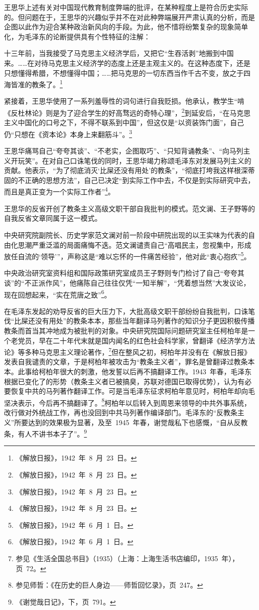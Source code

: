 王思华上述有关对中国现代教育制度弊端的批评，在某种程度上是符合历史实际的。但问题在于，王思华的兴趣似乎并不在对此种弊端展开严肃认真的分析，而是企图以此作为迎合某种政治新风向的手段。为此，他不惜将纷繁复杂的现象简单化，为毛泽东的论断提供具有个性特征的注解：

\begin{quoting}
十三年前，当我接受了马克思主义经济学后，又把它“生吞活剥”地搬到中国来。……在对待马克思主义经济学的态度上还是主观主义的。在这种态度下，还是只想懂得希腊，不想懂得中国；……把马克思的一切东西当作千古不变，放之于四海皆准的教条了。\footnote{《解放日报》，1942~年~8~月~23~日。}
\end{quoting}

紧接着，王思华使用了一系列羞辱性的词句进行自我贬损。他承认，教学生“啃《反杜林论》则是为了迎合学生的好高骛远的奇特心理”，\footnote{《解放日报》，1942~年~8~月~23~日。}到延安后，“在马克思主义中国化的口号之下，不得不联系到中国”，但这仅是“以资装饰门面”，自己仍“只想在《资本论》本身上来翻筋斗”。\footnote{《解放日报》，1942~年~8~月~23~日。}

王恩华痛骂自己“夸夸其谈”、“不老实，企图取巧”、“只知背诵教条”、“向马列主义开玩笑”。在对自己口诛笔伐的同时，王思华竭力称颂毛泽东对发展马列主义的贡献。他表示，“为了彻底消灭‘比屎还没有用处’的教条”，“彻底打垮我这样根深蒂固的不正确的思想方法”，自己已决定“到实际工作中去，不仅是到实际研究中去，而且是真正变为一个实际工作者”\footnote{《解放日报》，1942~年~8~月~23~日。}。

王思华的反省开创了教条主义高级文职干部自我批判的模式。范文澜、王子野等的自我反省文章同属于这一模式。

中央研究院副院长、历史学家范文澜对前一阶段中研院出现的以王实味为代表的自由化思潮严重泛滥的局面痛悔不迭。范文澜谴责自己“高唱民主，忽视集中，形成放任自流的‘领导’”，声称这是“难以忘怀的一件痛苦经验”，他对此“衷心抱疚”\footnote{《解放日报》，1942~年~6~月~1~日。}。

中央政治研究室资料组和国际政策研究室成员王子野则专门检讨了自己“夸夸其谈”的“不正派作风”，他痛陈自己往往仅凭“一知半解”，“凭着想当然”大发议论，现在回想起来，“实在荒唐之致”\footnote{《解放日报》，1942~年~6~月~1~日。}。

在毛泽东发起的劝导反省的巨大压力下，大批高级文职干部纷纷自我批判，口诛笔伐“比屎还没有用处”的教条本本，那些当年翻译马列著作的知识分子更因积极传播教条而首当其冲地成为被批判的对象。中央研究院国际问题研究室主任柯柏年是一个老党员，早在二十年代末就是国内闻名的红色社会科学家，曾翻译《经济学方法论》等多种马克思主义理论著作，\footnote{参见《生活全国总书目》（1935）（上海：上海生活书店编印，1935~年），页~72。}但在整风之初，柯柏年并没有在《解放日报》发表自我谴责的文章，于是柯柏年被攻击为“教条主义者”，罪名是曾翻译过教条本本。此事给柯柏年很大的刺激，他发誓以后再不搞翻译工作。1943~年春，毛泽东根据已变化了的形势（教条主义者已被搞臭，苏联对德国已取得优势），认为有必要恢复中共的马列著作翻译工作。可是当毛泽东征求柯柏年意见时，柯柏年却向毛坚决表示，今后再不搞翻译了。\footnote{参见师哲：《在历史的巨人身边——师哲回忆录》，页~247。}柯柏年以后转入到周恩来领导的中共外事系统，改行做对外统战工作，再也没回到中共马列著作编译部门。毛泽东的“反教条主义”所要达到的效果极为显著，及至~1945~年春，谢觉哉私下也感慨，“自从反教条，有人不讲书本子了”。\footnote{《谢觉哉日记》，下，页~791。}

